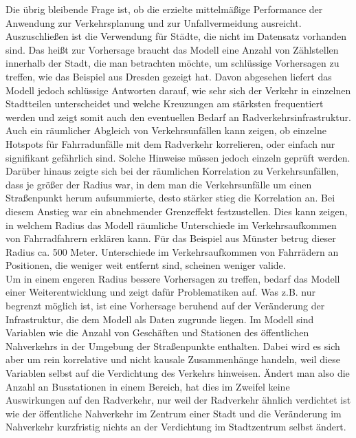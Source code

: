 \documentclass[a4paper,12pt]{thesis}
\begin{document}
Die übrig bleibende Frage ist, ob die erzielte mittelmäßige Performance der Anwendung zur Verkehrsplanung und zur Unfallvermeidung ausreicht. Auszuschließen ist die Verwendung für Städte, die nicht im Datensatz vorhanden sind. Das heißt zur Vorhersage braucht das Modell eine Anzahl von Zählstellen innerhalb der Stadt, die man betrachten möchte, um schlüssige Vorhersagen zu treffen, wie das Beispiel aus Dresden gezeigt hat. Davon abgesehen liefert das Modell jedoch schlüssige Antworten darauf, wie sehr sich der Verkehr in einzelnen Stadtteilen unterscheidet und welche Kreuzungen am stärksten frequentiert werden und zeigt somit auch den eventuellen Bedarf an Radverkehrsinfrastruktur. Auch ein räumlicher Abgleich von Verkehrsunfällen kann zeigen, ob einzelne Hotspots für Fahrradunfälle mit dem Radverkehr korrelieren, oder einfach nur signifikant gefährlich sind. Solche Hinweise müssen jedoch einzeln geprüft werden. Darüber hinaus zeigte sich bei der räumlichen Korrelation zu Verkehrsunfällen, dass je größer der Radius war, in dem man die Verkehrsunfälle um einen Straßenpunkt herum aufsummierte, desto stärker stieg die Korrelation an. Bei diesem Anstieg war ein abnehmender Grenzeffekt festzustellen. Dies kann zeigen, in welchem Radius das Modell räumliche Unterschiede im Verkehrsaufkommen von Fahrradfahrern erklären kann.  Für das Beispiel aus Münster betrug dieser Radius ca. 500 Meter. Unterschiede im Verkehrsaufkommen von Fahrrädern an Positionen, die weniger weit entfernt sind, scheinen weniger valide.\\
Um in einem engeren Radius bessere Vorhersagen zu treffen, bedarf das Modell einer Weiterentwicklung und zeigt dafür Problematiken auf. Was z.B. nur begrenzt möglich ist, ist eine Vorhersage beruhend auf der Veränderung der Infrastruktur, die dem Modell als Daten zugrunde liegen. Im Modell sind Variablen wie die Anzahl von Geschäften und Stationen des öffentlichen Nahverkehrs in der Umgebung der Straßenpunkte enthalten. Dabei wird es sich aber um rein korrelative und nicht kausale Zusammenhänge handeln, weil diese Variablen selbst auf die Verdichtung des Verkehrs hinweisen. Ändert man also die Anzahl an Busstationen in einem Bereich, hat dies im Zweifel keine Auswirkungen auf den Radverkehr, nur  weil der Radverkehr ähnlich verdichtet ist wie der öffentliche Nahverkehr im Zentrum einer Stadt und die Veränderung im Nahverkehr kurzfristig nichts an der Verdichtung im Stadtzentrum selbst ändert.\\
\end{document}
